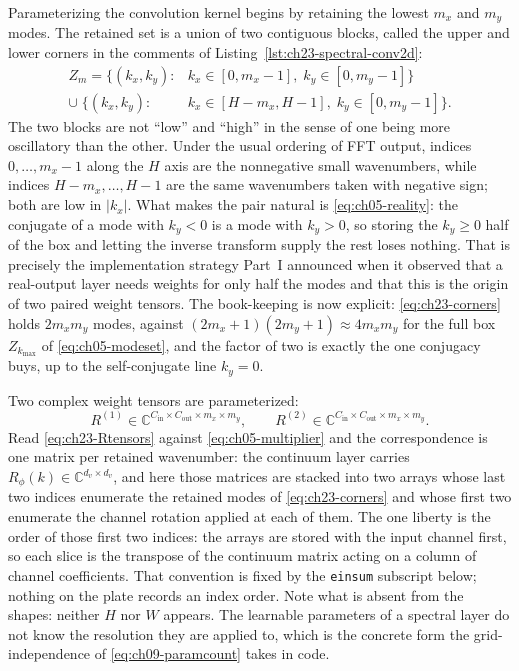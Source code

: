 Parameterizing the convolution kernel begins by retaining the lowest $m_x$ and
$m_y$ modes. The retained set is a union of two contiguous blocks, called the
upper and lower corners in the comments of
Listing~\ref{lst:ch23-spectral-conv2d}:
\begin{equation}
  \label{eq:ch23-corners}
  \begin{aligned}
  Z_m = \big\{(k_x, k_y): {}& k_x \in [0, m_x-1],\; k_y \in [0, m_y-1]\big\} \\
  \cup\; \big\{(k_x, k_y): {}& k_x \in [H - m_x, H-1],\; k_y \in [0, m_y-1]\big\}.
  \end{aligned}
\end{equation}
The two blocks are not ``low'' and ``high'' in the sense of one being more
oscillatory than the other. Under the usual ordering of FFT output, indices
$0, \dots, m_x - 1$ along the $H$ axis are the nonnegative small wavenumbers,
while indices $H - m_x, \dots, H - 1$ are the same wavenumbers taken with
negative sign; both are low in $|k_x|$. What makes the pair natural is
\eqref{eq:ch05-reality}: the conjugate of a mode with $k_y < 0$ is a mode with
$k_y > 0$, so storing the $k_y \ge 0$ half of the box and letting the inverse
transform supply the rest loses nothing. That is precisely the implementation
strategy Part~I announced when it observed that a real-output layer needs
weights for only half the modes and that this is the origin of two paired
weight tensors. The book-keeping is now explicit: \eqref{eq:ch23-corners} holds
$2 m_x m_y$ modes, against $(2m_x+1)(2m_y+1) \approx 4m_xm_y$ for the full box
$Z_{k_{\max}}$ of \eqref{eq:ch05-modeset}, and the factor of two is exactly the
one conjugacy buys, up to the self-conjugate line $k_y = 0$.

Two complex weight tensors are parameterized:
\begin{equation}
  \label{eq:ch23-Rtensors}
  R^{(1)} \in \mathbb{C}^{C_{\text{in}} \times C_{\text{out}} \times m_x \times m_y}, \qquad R^{(2)} \in \mathbb{C}^{C_{\text{in}} \times C_{\text{out}} \times m_x \times m_y}.
\end{equation}
Read \eqref{eq:ch23-Rtensors} against \eqref{eq:ch05-multiplier} and the
correspondence is one matrix per retained wavenumber: the continuum layer
carries $R_\phi(k) \in \mathbb{C}^{d_v \times d_v}$, and here those matrices
are stacked into two arrays whose last two indices enumerate the retained modes
of \eqref{eq:ch23-corners} and whose first two enumerate the channel rotation
applied at each of them. The one liberty is the order of those first two
indices: the arrays are stored with the input channel first, so each slice is
the transpose of the continuum matrix acting on a column of channel
coefficients. That convention is fixed by the \texttt{einsum} subscript below;
nothing on the plate records an index order. Note what is absent
from the shapes:
neither $H$ nor $W$ appears. The learnable parameters of a spectral layer do not
know the resolution they are applied to, which is the concrete form the
grid-independence of \eqref{eq:ch09-paramcount} takes in code.

